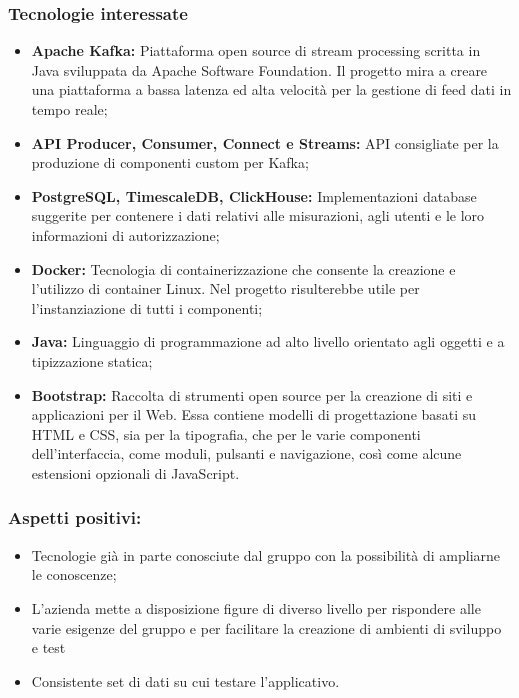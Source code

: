 	\subsubsection{Tecnologie interessate}
		\begin{itemize}
			\item \textbf{Apache Kafka:} Piattaforma open source di stream processing scritta in Java sviluppata da Apache Software Foundation. Il progetto mira a creare una piattaforma a bassa latenza ed alta velocità per la gestione di feed dati in tempo reale;
			\item \textbf{API Producer, Consumer, Connect e Streams:} API consigliate per la produzione di componenti custom per Kafka;
			\item \textbf{PostgreSQL, TimescaleDB, ClickHouse:} Implementazioni database suggerite per contenere i dati relativi alle misurazioni, agli utenti e le loro informazioni di autorizzazione;
			\item \textbf{Docker:} Tecnologia di containerizzazione che consente la creazione e l'utilizzo di container Linux. Nel progetto risulterebbe utile per l'instanziazione di tutti i componenti;
			\item \textbf{Java:} Linguaggio di programmazione ad alto livello orientato agli oggetti e a tipizzazione statica;
			\item \textbf{Bootstrap:} Raccolta di strumenti open source per la creazione di siti e applicazioni per il Web. Essa contiene modelli di progettazione basati su HTML e CSS, sia per la tipografia, che per le varie componenti dell'interfaccia, come moduli, pulsanti e navigazione, così come alcune estensioni opzionali di JavaScript.
		\end{itemize}

	\subsubsection{Aspetti positivi:}
		\begin{itemize}
			\item Tecnologie già in parte conosciute dal gruppo con la possibilità di ampliarne le conoscenze;
			\item L'azienda mette a disposizione figure di diverso livello per rispondere alle varie esigenze del gruppo e per facilitare la creazione di ambienti di sviluppo e test
			\item Consistente set di dati su cui testare l'applicativo.
		\end{itemize}

